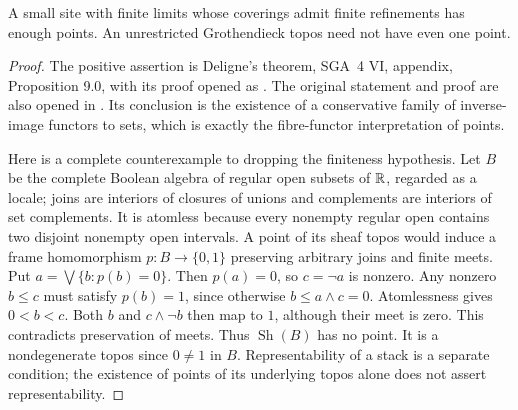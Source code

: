 \begin{theorem}\label{thm:B3-topos}
A small site with finite limits whose coverings admit finite
refinements has enough points. An unrestricted Grothendieck topos
need not have even one point.
\end{theorem}
\begin{proof}
The positive assertion is Deligne's theorem, SGA~4 VI, appendix,
Proposition 9.0, with its proof opened as
\cite[Proposition 7.39.3, tag 00YQ]{BStacks}. The original statement
and proof are also opened in
\cite[Expos\'e VI, Proposition 9.0, reedition pp.~464--466]{BSGA4Complete}.
Its conclusion is the
existence of a conservative family of inverse-image functors to sets,
which is exactly the fibre-functor interpretation of points.

Here is a complete counterexample to dropping the finiteness
hypothesis. Let $B$ be the complete Boolean algebra of regular open
subsets of ${\mathbb{R}}$, regarded as a locale; joins are interiors of closures
of unions and complements are interiors of set complements. It is
atomless because every nonempty regular open contains two disjoint
nonempty open intervals. A point of its sheaf topos would induce a
frame homomorphism $p:B\to\{0,1\}$ preserving arbitrary joins and
finite meets. Put $a=\bigvee\{b:p(b)=0\}$. Then $p(a)=0$, so
$c=\neg a$ is nonzero. Any nonzero $b\le c$ must satisfy $p(b)=1$,
since otherwise $b\le a\wedge c=0$. Atomlessness gives
$0<b<c$. Both $b$ and $c\wedge\neg b$ then map to $1$, although
their meet is zero. This contradicts preservation of meets.
Thus $\operatorname{Sh}(B)$ has no point. It is a nondegenerate topos
since $0\ne1$ in $B$. Representability of a stack is a separate
condition; the existence of points of its underlying topos alone
does not assert representability.
\end{proof}

